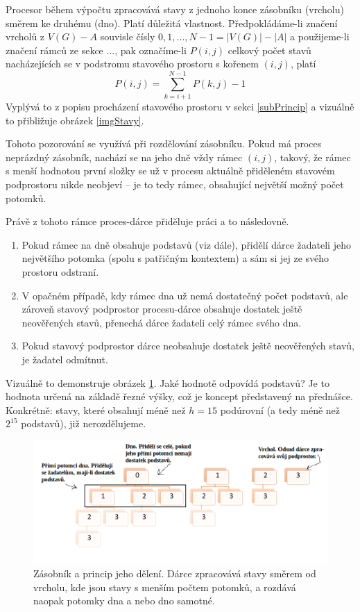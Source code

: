 \documentclass[12pt]{article}
\theoremstyle{definition}
\begin{document}
Procesor během výpočtu zpracovává stavy z jednoho konce zásobníku (vrcholu) směrem ke druhému (dno). Platí důležitá vlastnost. Předpokládáme-li
značení vrcholů z $V(G)-A$ souvisle čísly $0, 1, \dots, N - 1 = |V(G)| - |A|$ a
použijeme-li značení rámců ze sekce ..., pak označíme-li $P(i,j)$ celkový počet stavů nacházejících se v podstromu stavového prostoru
s kořenem $(i,j)$, platí
$$P(i,j)=\sum_{k=i+1}^{N-1}P(k,j)-1$$
Vyplývá to z popisu procházení stavového prostoru v sekci \ref{subPrincip} a vizuálně
to přibližuje obrázek \ref{imgStavy}.

Tohoto pozorování se využívá při rozdělování zásobníku. Pokud má proces neprázdný zásobník, nachází se na jeho dně vždy rámec $(i,j)$, takový, že rámec s menší hodnotou první složky
se už v procesu aktuálně přiděleném stavovém podprostoru nikde neobjeví -- je to tedy rámec, obsahující největší možný počet potomků.

Právě z tohoto rámce proces-dárce přiděluje práci a to následovně.
\begin{enumerate}
	\item Pokud rámec na dně obsahuje  podstavů (viz dále), přidělí dárce žadateli
	jeho největšího potomka (spolu s patřičným kontextem) a sám si jej ze svého prostoru
	odstraní.
	\item V opačném případě, kdy rámec dna už nemá dostatečný počet podstavů, ale zároveň
	stavový podprostor procesu-dárce obsahuje dostatek ještě neověřených stavů, přenechá
	dárce žadateli celý rámec svého dna.
	\item Pokud stavový podprostor dárce neobsahuje dostatek ještě neověřených stavů,
	je žadatel odmítnut.
\end{enumerate}
Vizuálně to demonstruje obrázek \ref{imgSplit}.
Jaké hodnotě odpovídá  podstavů? Je to hodnota určená
na základě řezné výšky, což je koncept představený na přednášce. Konkrétně:
stavy, které obsahují méně než $h=15$ podúrovní (a tedy méně než $2^{15}$ podstavů), již nerozdělujeme.
\begin{figure}[ht]
	\centering
	\includegraphics[width=1.0\textwidth]{obr/deleni.png}
	\caption{Zásobník a princip jeho dělení. Dárce zpracovává stavy směrem od vrcholu, kde
		jsou stavy s menším počtem potomků, a rozdává naopak potomky dna a nebo dno samotné.}
	\label{imgSplit}
\end{figure}
\end{document}
